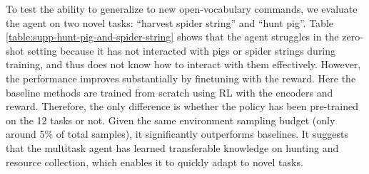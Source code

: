 To test the ability to generalize to new open-vocabulary commands, we evaluate the agent on two novel tasks: ``harvest spider string'' and ``hunt pig''. Table \ref{table:supp-hunt-pig-and-spider-string} shows that the agent struggles in the zero-shot setting because it has not interacted with pigs or spider strings during training, and thus does not know how to interact with them effectively. However, the performance improves substantially by finetuning with the \mineclip reward. Here the baseline methods are trained from scratch using RL with the \mineclip encoders and reward. Therefore, the only difference is whether the policy has been pre-trained on the 12 tasks or not. Given the same environment sampling budget (only around 5\% of total samples), it significantly outperforms baselines. It suggests that the multitask agent has learned transferable knowledge on hunting and resource collection, which enables it to quickly adapt to novel tasks.

